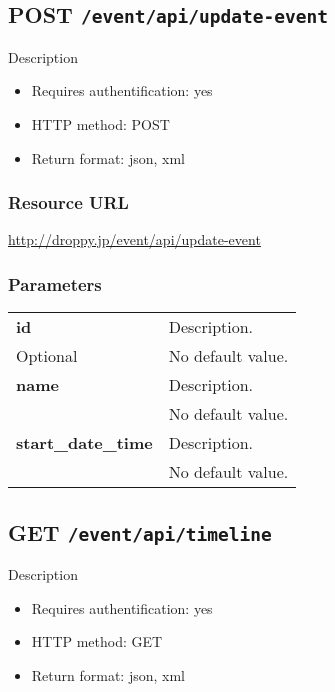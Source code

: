 \documentclass[11pt,a4paper]{article}
\newcommand{\content}[1]{\begin{minipage}{10cm}\vspace{2mm}#1\vspace{2mm}\end{minipage}}
\begin{document}
      \newpage
      
      
  \subsection*{POST {\tt /event/api/update-event}}
  Description
  \begin{itemize}
  \item Requires authentification: yes
  \item HTTP method: POST
  \item Return format: json, xml
  \end{itemize}
  \subsubsection*{Resource URL}
  \url{http://droppy.jp/event/api/update-event}
  \subsubsection*{Parameters}
  \begin{table}[h]
    \begin{center}
      \begin{tabular}{l l}
        \hline 
      \textbf{id} & \content{Description. }
      \\
      Optional & No default value.\\
      \hline
      \textbf{name} & \content{Description. }
      \\
       & No default value.\\
      \hline
      \textbf{start\_date\_time} & \content{Description. }
      \\
       & No default value.\\
      \hline
      \end{tabular}
    \end{center}
  \end{table}
  
      \newpage
      
      
  \subsection*{GET {\tt /event/api/timeline}}
  Description
  \begin{itemize}
  \item Requires authentification: yes
  \item HTTP method: GET
  \item Return format: json, xml
  \end{itemize}
\end{document}
